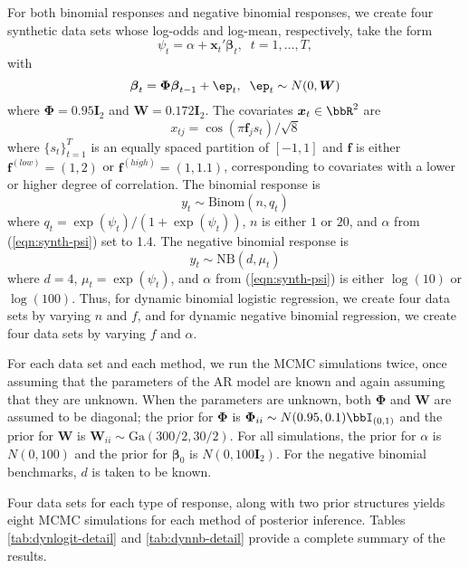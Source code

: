 \documentclass[12pt]{article}
\newcommand{\Ga}{\text{Ga}}
\newcommand{\bbeta}{\boldsymbol{\beta}}
\newcommand{\vx}{\boldsymbol{x}}
\newcommand{\bW}{\boldsymbol{W}}
\newcommand{\bPhi}{\boldsymbol{\Phi}}
\newcommand{\bI}{\boldsymbol{I}}
\newcommand{\vf}{\boldsymbol{f}}
\newcommand{\vep}{\boldsymbol{\ep}}
\begin{document}
For both binomial responses and negative binomial responses, we create four
synthetic data sets whose log-odds and log-mean, respectively, take the form
\begin{equation}
  \label{eqn:synth-psi}
  \psi_t = \alpha + \vx_t' \bbeta_t, \; \; t = 1, \ldots, T,
\end{equation}
with
\[
\bbeta_t = \bPhi \bbeta_{t-1} + \vep_t, \; \; \vep_t \sim N(0, \bW)
\]
where $\bPhi = 0.95 \bI_2$ and $\bW = 0.172 \bI_2$.  The covariates $\vx_t \in
\bbR^2$ are
\[
x_{tj} = \cos(\pi \vf_j s_t) / \sqrt{8}
\]
where $\{s_t\}_{t=1}^T$ is an equally spaced partition of $[-1,1]$ and $\vf$ is
either $\vf^{(low)} = (1,2)$ or $\vf^{(high)} = (1,1.1)$, corresponding to
covariates with a lower or higher degree of correlation.  The binomial response
is
\[
y_t \sim \text{Binom}(n, q_t)
\]
where $q_t = \exp({\psi_t}) / (1+\exp({\psi_t}))$, $n$ is either $1$ or $20$,
and $\alpha$ from (\ref{eqn:synth-psi}) set to 1.4.  The negative binomial
response is
\[
y_t \sim \text{NB}(d, \mu_t)
\]
where $d=4$, $\mu_t = \exp({\psi_t})$, and $\alpha$ from (\ref{eqn:synth-psi})
is either $\log(10)$ or $\log(100)$.  Thus, for dynamic binomial logistic
regression, we create four data sets by varying $n$ and $f$, and for dynamic
negative binomial regression, we create four data sets by varying $f$ and
$\alpha$.

For each data set and each method, we run the MCMC simulations twice, once
assuming that the parameters of the AR model are known and again assuming that
they are unknown.  When the parameters are unknown, both $\bPhi$ and $\bW$ are
assumed to be diagonal; the prior for $\bPhi$ is $\bPhi_{ii} \sim N(0.95, 0.1)
\bbI_{(0,1)}$ and the prior for $\bW$ is $\bW_{ii} \sim \Ga(300/2, 30/2)$.  For
all simulations, the prior for $\alpha$ is $N(0, 100)$ and the prior for
$\bbeta_0$ is $N(0, 100 \bI_2)$.  For the negative binomial benchmarks, $d$ is
taken to be known.

Four data sets for each type of response, along with two prior structures yields
eight MCMC simulations for each method of posterior inference.  Tables
\ref{tab:dynlogit-detail} and \ref{tab:dynnb-detail} provide a complete summary
of the results.

\end{document}
